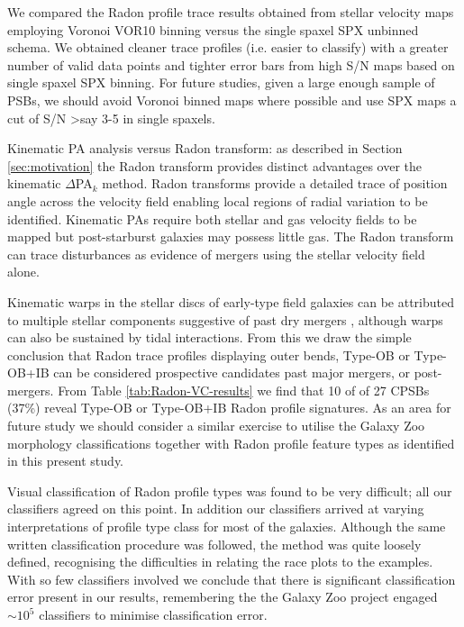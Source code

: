 We compared the Radon profile trace results obtained from stellar velocity maps employing Voronoi VOR10 binning versus the single spaxel SPX unbinned schema. We obtained cleaner trace profiles (i.e. easier to classify) with a greater number of valid data points and tighter error bars from high S/N maps based on single spaxel SPX binning. For future studies, given a large enough sample of PSBs, we should avoid Voronoi binned maps where possible and use SPX maps a cut of S/N \textgreater say 3-5 in single spaxels.

Kinematic PA analysis versus Radon transform: as described in Section \ref{sec:motivation} the Radon transform provides distinct advantages over the kinematic $\Delta$PA$_{k}$  method. Radon transforms provide a detailed trace of position angle across the velocity field enabling local regions of radial variation to be identified. Kinematic PAs require both stellar and gas velocity fields to be mapped but post-starburst galaxies may possess little gas. The Radon transform can trace disturbances as evidence of mergers using the stellar velocity field alone.

Kinematic warps in the stellar discs of early-type field galaxies can be attributed to multiple stellar components suggestive of past dry mergers \citep{2005AJ....130.2647V}, although warps can also be sustained by tidal interactions.
From this we draw the simple conclusion that Radon trace profiles displaying outer bends, Type-OB or Type-OB+IB can be considered prospective candidates past major mergers, or post-mergers. From Table \ref{tab:Radon-VC-results} we find that 10 of of 27 CPSBs (37\%) reveal Type-OB or Type-OB+IB Radon profile signatures. As an area for future study we should consider a similar exercise to utilise the Galaxy Zoo morphology classifications together with Radon profile feature types as identified in this present study. 

Visual classification of Radon profile types was found to be very difficult; all our classifiers agreed on this point. In addition our classifiers arrived at varying interpretations of profile type class for most of the galaxies. Although the same written classification procedure was followed, the method was quite loosely defined, recognising the difficulties in relating the race plots to the examples. With so few classifiers involved we conclude that there is significant classification error present in our results, remembering the the Galaxy Zoo project engaged $\sim10^5$ classifiers to minimise classification error.


